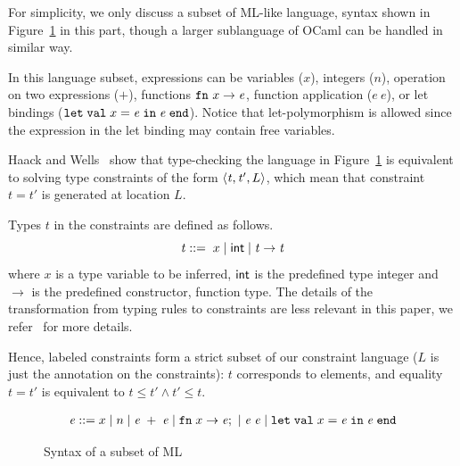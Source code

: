 For simplicity, we only discuss a subset of ML-like language, syntax shown in
Figure~\ref{figure:mltypes} in this part, though a larger sublanguage
of OCaml can be handled in similar way.

\newcommand\expr{\mathit{e}}
\newcommand\ty{\mathit{t}}

In this language subset, expressions can be variables ($x$), integers ($n$),
operation on two expressions ($+$), functions $\fn~x\rightarrow \expr$, function
application ($\expr~\expr$), or let bindings ($\kwlet\; \val\; x = \expr\; \kwin\;
\expr\; \kwend$). Notice that let-polymorphism is allowed since the expression in
the let binding may contain free variables.

Haack and Wells~\cite{haack:slicing} show that type-checking the language in
Figure~\ref{figure:mltypes} is equivalent to solving type constraints
of the
form $\configThree{\ty}{\ty'}{L}$, which mean that constraint $\ty = \ty'$ is
generated at location $L$. 

Types $\ty$ in the constraints are defined as follows.
\[\ty ::=\; x \mid \atom{int} \mid \ty \rightarrow \ty\]
\noindent where $x$ is a type variable to be inferred, $\textsf{int}$ is the predefined type integer and
$\rightarrow$ is the predefined constructor, function type. The details of the
transformation from typing rules to constraints are less relevant in this
paper, we refer~\cite{haack:slicing} for more details. 

Hence, labeled constraints form a strict subset of our constraint
language ($L$ is just the annotation on the constraints): $\ty$
corresponds to elements, and equality $\ty=\ty'$ is equivalent to
$\ty\leq \ty' \land \ty'\leq \ty$. 

\begin{figure}
\begin{minipage}{2in}
\begin{align*}
\expr ::=\; & x \mid n \mid \expr\; + \; \expr \mid \fn\; x
\rightarrow \expr;\ \mid \expr\; \expr \mid \kwlet\; \val\; x =
\expr\; \kwin\; \expr\; \kwend\\ \end{align*}
\end{minipage}
\caption{Syntax of a subset of ML}
\label{figure:mltypes}
\end{figure}


% 

